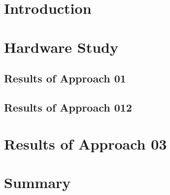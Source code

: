 \section{Introduction}
\lipsum[9-10]

\section{Hardware Study}
\lipsum[1-1]

\subsection{Results of Approach 01}
\lipsum[4-6]

\subsection{Results of Approach 012}

\lipsum[1-5]

\section{Results of Approach 03}
\lipsum[1-8]

\section{Summary}
\lipsum[2-3]
